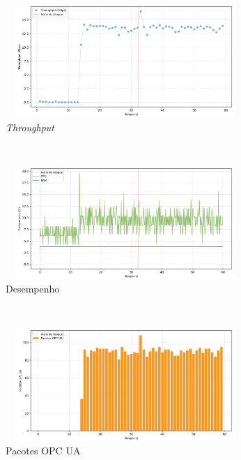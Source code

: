 \begin{apendicesenv}
\begin{figure}[htbp!]
    \centering
    \caption{\label{fig:1-dos_certificate_inf_chain_loop}Gráficos do ataque de DoS por loop infinito na cadeia de certificados - nível de segurança: `Sign'.}
    \begin{subfigure}[t]{0.5\textwidth}
        \centering
        \caption{\textit{Throughput}}
        \includegraphics[width=1\textwidth, height=120pt]{USPSC-img/output/cropped/1-dos_certificate_inf_chain_loop-tput.png}
    \end{subfigure}%
    ~ 
    \begin{subfigure}[t]{0.5\textwidth}
        \centering
        \caption{Desempenho}
        \includegraphics[width=1\textwidth, height=120pt]{USPSC-img/output/cropped/1-dos_certificate_inf_chain_loop-perf.png}
    \end{subfigure}%
    \\
    \begin{subfigure}[t]{0.5\textwidth}
        \centering
        \caption{Pacotes OPC UA}
        \includegraphics[width=1\textwidth, height=120pt]{USPSC-img/output/cropped/1-dos_certificate_inf_chain_loop-pack.png}
    \end{subfigure}%
    ~
    \begin{subfigure}[t]{0.5\textwidth}

\end{subfigure}
\end{figure}
\end{apendicesenv}

